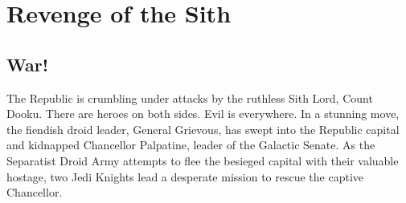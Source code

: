 \chapter{Revenge of the Sith}	
\section{War!}
The Republic is crumbling under attacks by the ruthless Sith 
Lord, Count Dooku. There are heroes on both sides. Evil is 
everywhere. In a stunning move, the fiendish droid leader, 
General Grievous, has swept into the Republic capital and 
kidnapped Chancellor Palpatine, leader of the Galactic Senate. 
As the Separatist Droid Army attempts to flee the besieged 
capital with their valuable hostage, two Jedi Knights lead 
a desperate mission to rescue the captive Chancellor.

\lipsum[1-10]
\cite{THEWS_2001}
